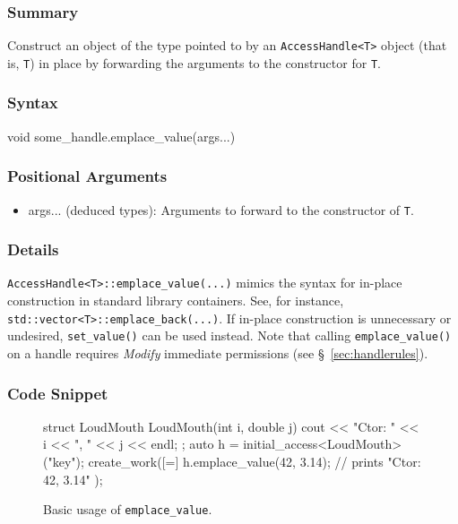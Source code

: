 \hspace{0.1cm} %
\begin{subs}
\vspace{-1.2cm}

\subsubsection{Summary} 
Construct an object of the type pointed to by an \texttt{AccessHandle<T>} object
(that is, \texttt{T}) in place by forwarding the arguments to the constructor
for \texttt{T}.

\subsubsection{Syntax} 
\begin{CppCode}
void some_handle.emplace_value(args...)
\end{CppCode}

\subsubsection{Positional Arguments} 
\begin{itemize}
\item args... (deduced types):  Arguments to forward to the constructor of
\texttt{T}.
\end{itemize}

\subsubsection{Details} 

\texttt{AccessHandle<T>::emplace\_value(...)} mimics the syntax for in-place
construction in standard library containers.  See, for instance,
\texttt{std::vector<T>::emplace\_back(...)}.  If in-place construction is
unnecessary or undesired, \texttt{set\_value()} can be used instead.  Note that
calling \texttt{emplace\_value()} on a handle requires {\it Modify} immediate
permissions (see \S~\ref{sec:handlerules}).

\subsubsection{Code Snippet} 
\begin{figure}[!h]
\begin{CppCodeNumb}
struct LoudMouth {
  LoudMouth(int i, double j) { cout << "Ctor: " << i << ", " << j << endl; }
};
auto h = initial_access<LoudMouth>("key");
create_work([=]{
  h.emplace_value(42, 3.14); // prints "Ctor: 42, 3.14" 
});
\end{CppCodeNumb}
\label{fig:fe_api_initialaccess}
\caption{Basic usage of \texttt{emplace\_value}.}
\end{figure}


\end{subs}
